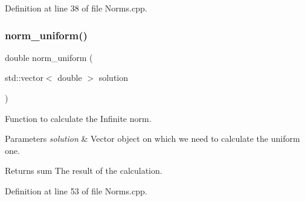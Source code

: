 Definition at line 38 of file Norms.\+cpp.

\mbox{\label{_norms_8h_a499e336aa7c1b95977115ce04115593c}} 
\subsubsection{norm\+\_\+uniform()}
{\footnotesize\ttfamily double norm\+\_\+uniform (\begin{DoxyParamCaption}\item[{std\+::vector$<$ double $>$}]{solution }\end{DoxyParamCaption})}



Function to calculate the Infinite norm. 


\begin{DoxyParams}{Parameters}
{\em solution} & Vector object on which we need to calculate the uniform one. \\
\hline
\end{DoxyParams}
\begin{DoxyReturn}{Returns}
sum The result of the calculation. 
\end{DoxyReturn}


Definition at line 53 of file Norms.\+cpp.

